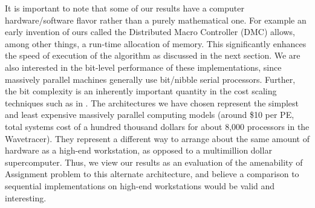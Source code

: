 It is important to note that some of our results have a 
computer hardware/software flavor rather than a purely mathematical 
one.  For example an early invention of ours called the
Distributed Macro Controller (DMC) \cite{hora88} allows, among other things, 
a run-time allocation of memory.  This significantly enhances 
the speed of execution of the algorithm as discussed in the 
next section.  We are also interested in the bit-level performance 
of these implementations, since massively parallel machines generally use 
bit/nibble serial processors.  Further, the bit complexity is 
an inherently important quantity in the cost scaling techniques 
such as in \cite{gpv88}.  The architectures we have chosen represent 
the simplest and least expensive massively parallel computing 
models (around \$10 per PE, total systems cost of a  hundred 
thousand dollars for about 8,000 processors in the Wavetracer).  They 
represent a different way to arrange about the same amount of 
hardware as a high-end workstation, as opposed to a multimillion 
dollar supercomputer.  Thus, we view our results as an evaluation of 
the amenability of Assignment problem to this alternate architecture, and 
believe a comparison to sequential implementations on high-end 
workstations would be valid and interesting.

